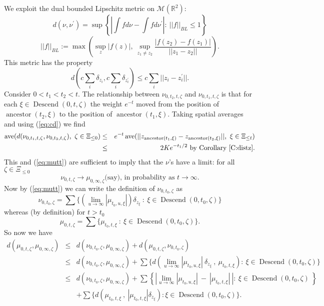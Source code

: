 \documentclass[12pt]{article}
\newcommand{\MM}{\mbox{${\mathcal M}$}}
\newcommand{\sfrac}[2]{{\textstyle\frac{#1}{#2}}}
\newcommand{\Reals}{{\mathbb{R}}}
\DeclareMathOperator{\ave}{ave}
\DeclareMathOperator{\ancestor}{ancestor}
\DeclareMathOperator{\descend}{Descend}
\begin{document}
 We exploit the dual bounded Lipschitz metric on $\MM(\Reals^2)$:
 \[ d(\nu, \nu^\prime) = \sup \left\{ \left| \int f d \nu - \int f d\nu^\prime \right|: \ ||f||_{BL} \le 1 \right\} \]
 \[ ||f||_{BL}  := \max \left( \sup_z |f(z)|, \ \sup_{z_1 \ne z_2} \sfrac{|f(z_2) - f(z_1)|}{ ||z_1 - z_2||} \right) .\]
 This metric has the property
 \begin{equation}
 d \left( c \sum_i \delta_{z_i}, c \sum_i \delta_{z^\prime_i} \right) \le c \sum_i ||z_i - z^\prime_i|| . 
 \label{eq:cd}
 \end{equation}
 Consider $0 < t_1 < t_2 < t$.
The relationship between $\nu_{0,t_2,t,\zeta}$ and $\nu_{0,t_1,t,\zeta}$ is that for  
each $\xi \in \descend(0,t,\zeta)$ the weight $e^{-t}$ moved from the position of 
$\ancestor(t_2,\xi)$ to the position of 
$\ancestor(t_1,\xi)$.
Taking spatial averages and using (\ref{eq:cd}) we find
\begin{eqnarray*}
\ave( d(\nu_{0,t_1,t,\zeta}, \nu_{0,t_2,t,\zeta}), \ \zeta \in \Xi_{\le 0} )  
&\le & e^{-t}  \ave( || z_{\ancestor(t_1,\xi)} - z_{\ancestor(t_2,\xi)} ||, \ \xi \in \Xi_{\le t}) 
\\
& \le  & 2 K e^{-t_1/2} \mbox{ by Corollary \ref{C:distz}}. 
\end{eqnarray*}
This and  (\ref{eq:mutt}) are sufficient to imply that the $\nu$'s have a limit: for all $\zeta \in \Xi_{\le 0}$
 \begin{equation}
   \nu_{0,t,\zeta} \to \mu_{0, \infty, \zeta} \mbox{(say),  in probability as } t \to \infty.
\label{eq:znm}
\end{equation}
 Now by (\ref{eq:mutt}) we can write the definition of $ \nu_{0,t_0,\zeta}$ as
\[  \nu_{0,t_0,\zeta} = \sum \{ (\lim_{u \to \infty} | \mu_{t_0,u,\xi}|) \delta_{z_\xi} \ : \ \xi \in \descend(0,t_0,\zeta) \}   \]
whereas (by definition) for $t > t_0$ 
\[ \mu_{0,t,\zeta}  = \sum \{  \mu_{t_0,t,\xi} \ : \ \xi \in \descend(0,t_0,\zeta) \}  . \]
So now we have
\begin{eqnarray*}
d(\mu_{0,t,\zeta} , \mu_{0, \infty, \zeta}) & \le & d(\nu_{0,t_0,\zeta} , \mu_{0, \infty, \zeta}) + d(\mu_{0,t,\zeta} , \nu_{0, t_0, \zeta}) \\
& \le & d(\nu_{0,t_0,\zeta} , \mu_{0, \infty, \zeta})  
+ \sum \{ d ( \lim_{u \to \infty} |\mu_{t_0,u,\xi}|  \ \delta_{z_\xi} \ , \ \mu_{t_0,t,\xi} ) :\ \xi \in \descend(0,t_0,\zeta) \} \\
& \le & d(\nu_{0,t_0,\zeta} , \mu_{0, \infty, \zeta})  
+ \sum \left\{ \left|   \lim_{u \to \infty} |\mu_{t_0,u,\xi}| \ - \ | \mu_{t_0,t,\xi}| \ \right| : \ \xi \in \descend(0,t_0,\zeta) \ \right\} \\
&& + \sum \{ d( \mu_{t_0,t,\xi} \ , \ |\mu_{t_0,t,\xi}| \delta_{z_\xi}) : \xi \in \descend(0,t_0,\zeta) \} .
\end{eqnarray*}
\end{document}
